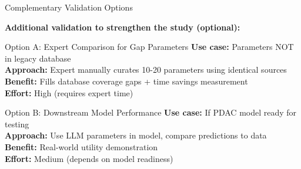 \documentclass[10pt]{beamer}
\begin{document}
\begin{frame}{Complementary Validation Options}

  \textbf{Additional validation to strengthen the study (optional):}

  \vspace{0.3cm}

  \begin{block}{Option A: Expert Comparison for Gap Parameters}
    \textbf{Use case:} Parameters NOT in legacy database\\
    \textbf{Approach:} Expert manually curates 10-20 parameters using identical sources\\
    \textbf{Benefit:} Fills database coverage gaps + time savings measurement\\
    \textbf{Effort:} High (requires expert time)
  \end{block}

  \vspace{0.3cm}

  \begin{block}{Option B: Downstream Model Performance}
    \textbf{Use case:} If PDAC model ready for testing\\
    \textbf{Approach:} Use LLM parameters in model, compare predictions to data\\
    \textbf{Benefit:} Real-world utility demonstration\\
    \textbf{Effort:} Medium (depends on model readiness)
  \end{block}

\end{frame}
\end{document}
